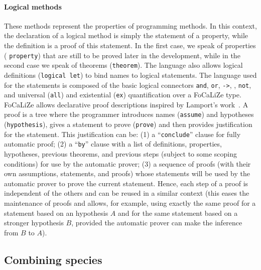 \documentclass[submission,copyright,creativecommons]{eptcs}
\def\focalize{FoCaLiZe \mbox{}}
\begin{document}
\paragraph{Logical methods}
These methods represent the properties of
programming methods. In this context, the declaration of a logical method 
is simply the statement of a property, while the definition is a proof of
this statement. In the first case, we speak of {properties} ({\small
  \tt property}) that are still
to be proved later in the development, while in the second case we speak of
{theorems} ({\small \tt theorem}). 
The language also allows logical definitions ({\small \tt logical
  let}) to bind names to logical statements.
The language used for the statements is composed of the basic logical
connectors {\small \tt and}, {\small \tt or}, {\small \tt ->}, {\small \tt <->}, {\small \tt not}, 
and universal ({\small \tt all})
and existential ({\small \tt ex}) quantification over a \focalize type.
\focalize allows declarative proof descriptions inspired by Lamport's
work~\cite{Lamport95,chaudhuri:proof}. A proof is a tree where the programmer
introduces names ({\small \tt assume}) and hypotheses ({\small \tt hypothesis}), gives a statement to
prove ({\small \tt prove}) and then provides justification for the
statement. This justification can be: (1) a ``{\small \tt conclude}'' clause for
fully automatic proof; (2) a ``{\small \tt by}'' clause with a list of
definitions, properties, hypotheses, previous theorems, and previous
steps (subject to some scoping conditions) for use by the automatic
prover; (3) a sequence of proofs (with their own assumptions,
statements, and proofs) whose statements will be used by the automatic
prover to prove the current statement.
Hence, each step of a proof is independent of the others and can be
reused in a similar context (this eases the maintenance of proofs and
allows, for example, using exactly the same proof for a statement based on an
hypothesis $A$ and for the same statement based on a stronger
hypothesis $B$, provided the automatic prover can make the inference
from $B$ to $A$).



\subsection{Combining species}
\end{document}
